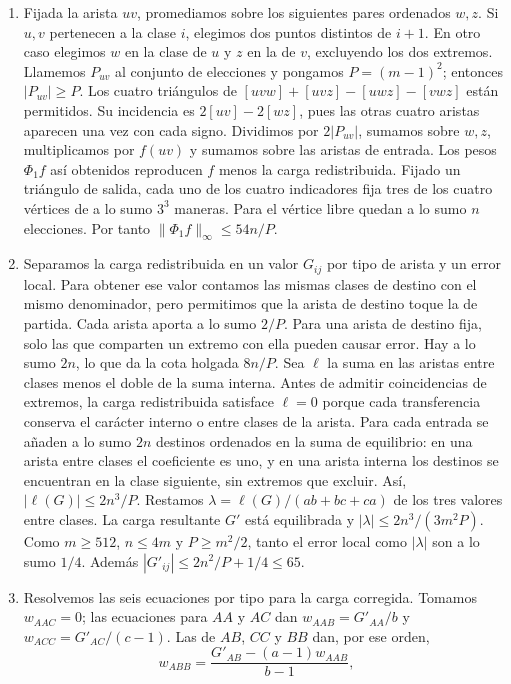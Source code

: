 \documentclass[spanish,11pt,a4paper]{article}
\providecommand{\tightlist}{\setlength{\itemsep}{0pt}\setlength{\parskip}{0pt}}
\begin{document}
\begin{enumerate}
\def\labelenumi{\arabic{enumi}.}
\tightlist
\item
  Fijada la arista \(uv\), promediamos sobre los siguientes pares ordenados \(w,z\). Si \(u,v\) pertenecen a la clase \(i\), elegimos dos puntos distintos de \(i+1\). En otro caso elegimos \(w\) en la clase de \(u\) y \(z\) en la de \(v\), excluyendo los dos extremos. Llamemos \(P_{uv}\) al conjunto de elecciones y pongamos \(P=(m-1)^2\); entonces \(|P_{uv}|\ge P\). Los cuatro triángulos de \([uvw]+[uvz]-[uwz]-[vwz]\) están permitidos. Su incidencia es \(2[uv]-2[wz]\), pues las otras cuatro aristas aparecen una vez con cada signo. Dividimos por \(2|P_{uv}|\), sumamos sobre \(w,z\), multiplicamos por \(f(uv)\) y sumamos sobre las aristas de entrada. Los pesos \(\Phi_1 f\) así obtenidos reproducen \(f\) menos la carga redistribuida. Fijado un triángulo de salida, cada uno de los cuatro indicadores fija tres de los cuatro vértices de a lo sumo \(3^3\) maneras. Para el vértice libre quedan a lo sumo \(n\) elecciones. Por tanto \(\|\Phi_1 f\|_\infty\le54n/P\).
\item
  Separamos la carga redistribuida en un valor \(G_{ij}\) por tipo de arista y un error local. Para obtener ese valor contamos las mismas clases de destino con el mismo denominador, pero permitimos que la arista de destino toque la de partida. Cada arista aporta a lo sumo \(2/P\). Para una arista de destino fija, solo las que comparten un extremo con ella pueden causar error. Hay a lo sumo \(2n\), lo que da la cota holgada \(8n/P\). Sea \(\ell\) la suma en las aristas entre clases menos el doble de la suma interna. Antes de admitir coincidencias de extremos, la carga redistribuida satisface \(\ell=0\) porque cada transferencia conserva el carácter interno o entre clases de la arista. Para cada entrada se añaden a lo sumo \(2n\) destinos ordenados en la suma de equilibrio: en una arista entre clases el coeficiente es uno, y en una arista interna los destinos se encuentran en la clase siguiente, sin extremos que excluir. Así, \(|\ell(G)|\le 2n^3/P\). Restamos \(\lambda=\ell(G)/(ab+bc+ca)\) de los tres valores entre clases. La carga resultante \(G'\) está equilibrada y \(|\lambda|\le2n^3/(3m^2P)\). Como \(m\ge512\), \(n\le4m\) y \(P\ge m^2/2\), tanto el error local como \(|\lambda|\) son a lo sumo \(1/4\). Además \(|G'_{ij}|\le2n^2/P+1/4\le65\).
\item
  Resolvemos las seis ecuaciones por tipo para la carga corregida. Tomamos \(w_{AAC}=0\); las ecuaciones para \(AA\) y \(AC\) dan \(w_{AAB}=G'_{AA}/b\) y \(w_{ACC}=G'_{AC}/(c-1)\). Las de \(AB\), \(CC\) y \(BB\) dan, por ese orden, \[w_{ABB}=\frac{G'_{AB}-(a-1)w_{AAB}}{b-1},\quad
\]
\end{enumerate}
\end{document}
